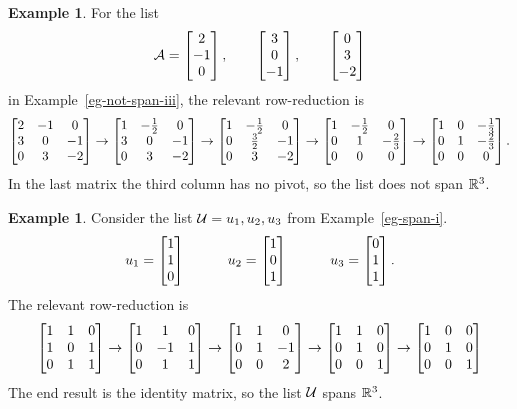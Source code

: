 \documentclass[reqno]{amsart}
\theoremstyle{definition}
\newtheorem{example}[theorem]{Example}
\begin{document}
\begin{example}
 For the list
 \[ \mathcal{A} = \left[\begin{matrix} 2 \\ -1 \\  0 \end{matrix}\right], \qquad
          \left[\begin{matrix} 3 \\  0 \\ -1 \end{matrix}\right], \qquad
          \left[\begin{matrix} 0 \\  3 \\ -2 \end{matrix}\right]
 \]
 in Example~\ref{eg-not-span-iii}, the relevant row-reduction is
 \[ \left[\begin{matrix} 2 & -1 & 0 \\ 3 & 0 & -1 \\ 0 & 3 & -2 \end{matrix}\right] \to
    \left[\begin{matrix} 1 & -\tfrac{1}{2} & 0 \\ 3 & 0 & -1 \\ 0 & 3 & -2 \end{matrix}\right] \to
    \left[\begin{matrix} 1 & -\tfrac{1}{2} & 0 \\ 0 & \tfrac{3}{2} & -1 \\ 0 & 3 & -2 \end{matrix}\right] \to
    \left[\begin{matrix} 1 & -\tfrac{1}{2} & 0 \\ 0 & 1 & -\tfrac{2}{3} \\ 0 & 0 & 0 \end{matrix}\right] \to
    \left[\begin{matrix} 1 & 0 & -\tfrac{1}{3} \\ 0 & 1 & -\tfrac{2}{3} \\ 0 & 0 & 0 \end{matrix}\right].
 \]
 In the last matrix the third column has no pivot, so the list does
 not span ${\mathbb{R}}^3$.
\end{example}
\begin{example}\label{eg-span-i-matrix}
 Consider the list $\mathcal{U}=u_1,u_2,u_3$ from Example~\ref{eg-span-i}.
 \[ u_1 = \left[\begin{matrix} 1 \\ 1 \\ 0 \end{matrix}\right] \hspace{3em}
    u_2 = \left[\begin{matrix} 1 \\ 0 \\ 1 \end{matrix}\right] \hspace{3em}
    u_3 = \left[\begin{matrix} 0 \\ 1 \\ 1 \end{matrix}\right].
 \]
 The relevant row-reduction is
 \[ \left[\begin{matrix} 1 & 1 & 0 \\ 1 &  0 &  1 \\ 0 & 1 & 1 \end{matrix}\right] \to
    \left[\begin{matrix} 1 & 1 & 0 \\ 0 & -1 &  1 \\ 0 & 1 & 1 \end{matrix}\right] \to
    \left[\begin{matrix} 1 & 1 & 0 \\ 0 &  1 & -1 \\ 0 & 0 & 2 \end{matrix}\right] \to
    \left[\begin{matrix} 1 & 1 & 0 \\ 0 &  1 &  0 \\ 0 & 0 & 1 \end{matrix}\right] \to
    \left[\begin{matrix} 1 & 0 & 0 \\ 0 &  1 &  0 \\ 0 & 0 & 1 \end{matrix}\right]
 \]
 The end result is the identity matrix, so the list $\mathcal{U}$ spans
 ${\mathbb{R}}^3$.
\end{example}
\end{document}
